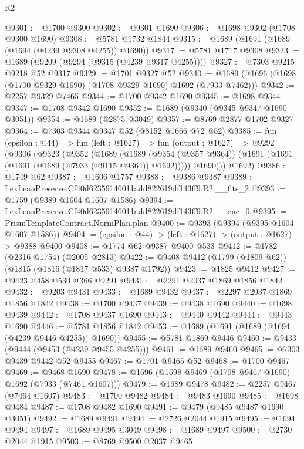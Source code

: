 \begin{lexlean}{R2}
\begin{coremodule}
@9301 := @1700 @9300
@9302 := @9301 @1690
@9306 := @1698 @9302 (@1708 @9300 @1690)
@9308 := @5781 @1732 @1844
@9315 := @1689 (@1691 (@1689 (@1694 (@4239 @9308 @4255)) @1690))
@9317 := @5781 @1717 @9308
@9323 := @1689 (@9209 (@9294 (@9315 (@4239 @9317 @4255))))
@9327 := @7303 @9215 @9218 @52 @9317
@9329 := @1701 @9327 @52
@9340 := @1689 (@1696 (@1698 (@1700 @9329 @1690) (@1708 @9329 @1690) @1692 (@7933 @7462)))
@9342 := @2257 @9329 @7465
@9344 := @1700 @9342 @1690
@9345 := @1698 @9344
@9347 := @1708 @9342 @1690
@9352 := @1689 (@9340 (@9345 @9347 @1690 @3051))
@9354 := @1689 (@2875 @3049)
@9357 := @8769 @2877 @1702 @9327
@9364 := @7303 @9344 @9347 @52 (@8152 @1666 @72 @52)
@9385 := fun (epsilon : @44) =>
  fun (left : @1627) =>
  fun (output : @1627) =>
  @9292
    (@9306
      (@9323
        (@9352
          (@1689
            (@1689
              (@9354 (@9357 @9364))
              (@1691 (@1691 (@1691 (@1689 (@7933 (@9115 @9364)) @1692)))))
            @1690)))
      @1692)
@9386 := @1749 @62
@9387 := @1606 @1757
@9388 := @9386 @9387
@9389 := LexLeanPreserve.Cf40d62359146011add822619df143ff9.R2.__fits_2
@9393 := @1759 (@9389 @1604 @1607 @1586)
@9394 := LexLeanPreserve.Cf40d62359146011add822619df143ff9.R2.__enc_0
@9395 := PrismTemplateContract.NormPlan.plan
@9400 := @9393 (@9394 (@9395 @1604 @1607 @1586))
@9404 := (epsilon : @44) -> (left : @1627) -> (output : @1627) -> @9388 @9400
@9408 := @1774 @62 @9387 @9400 @533
@9412 := @1782 (@2316 @1754) (@2005 @2813)
@9422 := @9408 @9412 (@1799 (@1809 @62)) (@1815 (@1816 (@1817 @533) @9387 @1792))
@9423 := @1825 @9412
@9427 := @9423 @458 @530 @366 @9291
@9431 := @2291 @2037 @1869 @1856 @1842
@9432 := @9203 @9431
@9433 := @1689 @9432
@9437 := @2297 @2037 @1869 @1856 @1842
@9438 := @1700 @9437
@9439 := @9438 @1690
@9440 := @1698 @9439
@9442 := @1708 @9437 @1690
@9443 := @9440 @9442
@9444 := @9443 @1690
@9446 := @5781 @1856 @1842
@9453 := @1689 (@1691 (@1689 (@1694 (@4239 @9446 @4255)) @1690))
@9455 := @5781 @1869 @9446
@9460 := @9433 (@9444 (@9453 (@4239 @9455 @4255)))
@9461 := @1689 @9460
@9465 := @7303 @9439 @9442 @52 @9455
@9467 := @1701 @9465 @52
@9468 := @1700 @9467
@9469 := @9468 @1690
@9478 := @1696 (@1698 @9469 (@1708 @9467 @1690) @1692 (@7933 (@7461 @1607)))
@9479 := @1689 @9478
@9482 := @2257 @9467 (@7464 @1607)
@9483 := @1700 @9482
@9484 := @9483 @1690
@9485 := @1698 @9484
@9487 := @1708 @9482 @1690
@9491 := @9479 (@9485 @9487 @1690 @3051)
@9492 := @1689 @9491
@9494 := @2726 @2044 @1915
@9495 := @1694 @9494
@9497 := @1689 @9495 @3049
@9498 := @1689 @9497
@9500 := @2730 @2044 @1915
@9503 := @8769 @9500 @2037 @9465

\end{coremodule}
\end{lexlean}
